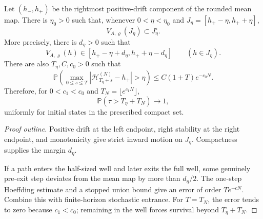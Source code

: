 \begin{lemma}
  \label{lem:metastable-inward-margin}
  \leanok
  Let $(h_-,h_+)$ be the rightmost positive-drift component of the rounded
  mean map.  There is $\eta_0>0$ such that, whenever $0<\eta<\eta_0$ and
  $J_\eta=[h_+-\eta,h_++\eta]$,
  \[
    V_{A,\varrho}(J_\eta)\subset J_\eta^\circ.
  \]
  More precisely, there is $d_\eta>0$ such that
  \[
    V_{A,\varrho}(h)\in
    [h_+-\eta+d_\eta,h_++\eta-d_\eta]
    \qquad (h\in J_\eta).
  \]
  There are also $T_\eta,C,c_0>0$ such that
  \[
    \mathbb P\!\left(
      \max_{0\leq s\leq T}
      |\mathscr H_{T_\eta+s}^{(N)}-h_+|>\eta
    \right)
    \leq C(1+T)e^{-c_0N}.
  \]
  Therefore, for $0<c_1<c_0$ and $T_N=\lfloor e^{c_1N}\rfloor$,
  \[
    \mathbb P(\tau>T_\eta+T_N)\longrightarrow1,
  \]
  uniformly for initial states in the prescribed compact set.
\end{lemma}
\begin{proof}[Proof outline]
  \leanok
  Positive drift at the left endpoint, right stability at the right endpoint,
  and monotonicity give strict inward motion on $J_\eta$. Compactness supplies
  the margin $d_\eta$.

  If a path enters the half-sized well and later exits the full well, some
  genuinely pre-exit step deviates from the mean map by more than
  $d_\eta/2$. The one-step Hoeffding estimate and a stopped union bound give
  an error of order $Te^{-cN}$. Combine this with finite-horizon stochastic
  entrance. For $T=T_N$, the error tends to zero because $c_1<c_0$; remaining
  in the well forces survival beyond $T_\eta+T_N$.
\end{proof}

